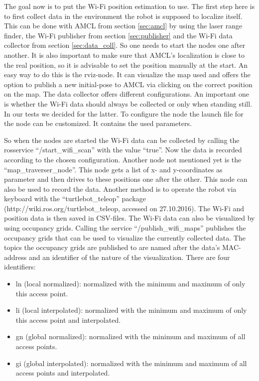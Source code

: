 The goal now is to put the Wi-Fi position estimation to use. The first step here is to first collect data in the environment the robot is supposed to localize itself. This can be done with AMCL from section \ref{sec:amcl} by using the laser range finder, the Wi-Fi publisher from section \ref{sec:publisher} and the Wi-Fi data collector from section \ref{sec:data_coll}. So one needs to start the nodes one after another. It is also important to make sure that AMCL's localization is close to the real position, so it is advisable to set the position manually at the start. An easy way to do this is the rviz-node. It can visualize the map used and offers the option to publish a new initial-pose to AMCL via clicking on the correct position on the map. The data collector offers different configurations. An important one is whether the Wi-Fi data should always be collected or only when standing still. In our tests we decided for the latter. To configure the node the launch file for the node can be customized. It contains the used parameters.

So when the nodes are started the Wi-Fi data can be collected by calling the rosservice ``/start\_wifi\_scan'' with the value ``true''. Now the data is recorded according to the chosen configuration. Another node not mentioned yet is the ``map\_traverser\_node''. This node gets a list of x- and y-coordinates as parameter and then drives to these positions one after the other. This node can also be used to record the data. Another method is to operate the robot via keyboard with the ``turtlebot\_teleop'' package (http://wiki.ros.org/turtlebot\_teleop, accessed on 27.10.2016). The Wi-Fi and position data is then saved in CSV-files. The Wi-Fi data can also be visualized by using occupancy grids. Calling the service ``/publish\_wifi\_maps'' publishes the occupancy grids that can be used to visualize the currently collected data. The topics the occupancy grids are published to are named after the data's \Gls{MAC-address} and an identifier of the nature of the visualization. There are four identifiers:
\begin{itemize}
\item ln (local normalized): normalized with the minimum and maximum of only this access point.
\item li (local interpolated): normalized with the minimum and maximum of only this access point and interpolated.
\item gn (global normalized): normalized with the minimum and maximum of all access points.
\item gi (global interpolated): normalized with the minimum and maximum of all access points and interpolated.
\end{itemize}

